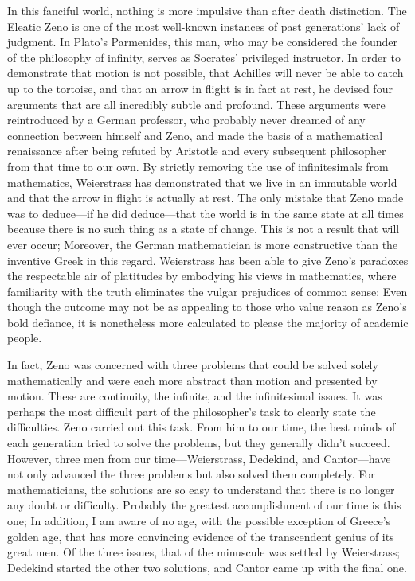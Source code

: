 \documentclass[a4paper,12pt]{book}[2004/02/16]
\theoremstyle{ilemma}
\theoremstyle{itheorem}
\theoremstyle{iother}
\theoremstyle{icorollary}
\theoremstyle{numcorollary}
\theoremstyle{idefinition}
\begin{document}
In this fanciful world, nothing is more impulsive than after death
distinction. The Eleatic Zeno is one of the most well-known instances of past generations' lack of judgment. In Plato's Parmenides, this man, who may be considered the founder of the philosophy of infinity, serves as Socrates' privileged instructor. In order to demonstrate that motion is not possible, that Achilles will never be able to catch up to the tortoise, and that an arrow in flight is in fact at rest, he devised four arguments that are all incredibly subtle and profound. These arguments were reintroduced by a German professor, who probably never dreamed of any connection between himself and Zeno, and made the basis of a mathematical renaissance after being refuted by Aristotle and every subsequent philosopher from that time to our own. By strictly removing the use of infinitesimals from mathematics, Weierstrass has demonstrated that we live in an immutable world and that the arrow in flight is actually at rest. The only mistake that Zeno made was to deduce—if he did deduce—that the world is in the same state at all times because there is no such thing as a state of change. This is not a result that will ever occur; Moreover, the German mathematician is more constructive than the inventive Greek in this regard. Weierstrass has been able to give Zeno's paradoxes the respectable air of platitudes by embodying his views in mathematics, where familiarity with the truth eliminates the vulgar prejudices of common sense; Even though the outcome may not be as appealing to those who value reason as Zeno's bold defiance, it is nonetheless more calculated to please the majority of academic people.

In fact, Zeno was concerned with three problems that could be solved solely mathematically and were each more abstract than motion and presented by motion. These are continuity, the infinite, and the infinitesimal issues. It was perhaps the most difficult part of the philosopher's task to clearly state the difficulties. Zeno carried out this task. From him to our time, the best minds of each generation tried to solve the problems, but they generally didn't succeed. However, three men from our time—Weierstrass, Dedekind, and Cantor—have not only advanced the three problems but also solved them completely. For mathematicians, the solutions are so easy to understand that there is no longer any doubt or difficulty. Probably the greatest accomplishment of our time is this one; In addition, I am aware of no age, with the possible exception of Greece's golden age, that has more convincing evidence of the transcendent genius of its great men.
Of the three issues, that of the minuscule was settled by
Weierstrass; Dedekind started the other two solutions, and Cantor came up with the final one.
\end{document}
